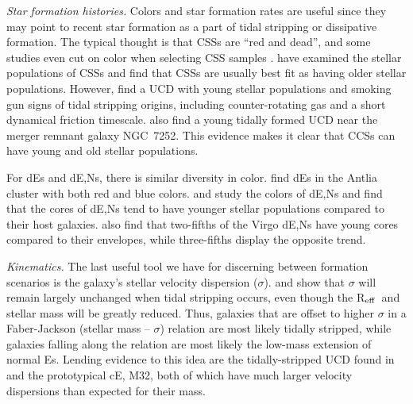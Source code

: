 \documentclass[iop,apj]{emulateapj}
\newcommand{\Reff}{R$_{\rm eff}$}
\begin{document}
\textit{Star formation histories.} 
Colors and star formation rates are useful since they may point to recent star formation as a part of tidal stripping or dissipative formation. The typical thought is that CSSs are ``red and dead'', and some studies even cut on color when selecting CSS samples \citep{Chilingarian2015}. \citet{Drinkwater2000} have examined the stellar populations of CSSs and find that CSSs are usually best fit as having older stellar populations. However, \citet{Norris2011} find a UCD with young stellar populations and smoking gun signs of tidal stripping origins, including counter-rotating gas and a short dynamical friction timescale. \citet{Maraston2004} also find a young tidally formed UCD near the merger remnant galaxy NGC~7252. This evidence makes it clear that CCSs can have young and old stellar populations.

For dEs and dE,Ns, there is similar diversity in color. \citet{SmithCastelli2012} find dEs in the Antlia cluster with both red and blue colors. \citet{Drinkwater2000} and \citet{Ferrarese2006} study the colors of dE,Ns and find that the cores of dE,Ns tend to have younger stellar populations compared to their host galaxies. \cite{Grant2005} also find that two-fifths of the Virgo dE,Ns have young cores compared to their envelopes, while three-fifths display the opposite trend. 

\textit{Kinematics.}  The last useful tool we have for discerning between formation scenarios is the galaxy's stellar velocity dispersion ($\sigma$). \citet{Bender1992} and \citet{Bekki2003} show that $\sigma$ will remain largely unchanged when tidal stripping occurs, even though the \Reff\ and stellar mass will be greatly reduced. Thus, galaxies that are offset to higher $\sigma$ in a Faber-Jackson (stellar mass -- $\sigma$) relation \citep{faber1976} are most likely tidally stripped, while galaxies falling along the relation are most likely the low-mass extension of normal Es. Lending evidence to this idea are the tidally-stripped UCD found in \citet{Maraston2004} and the prototypical cE, M32, both of which have much larger velocity dispersions than expected for their mass.
\end{document}
